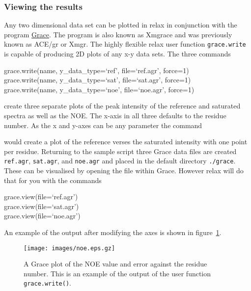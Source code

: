 \subsubsection{Viewing the results}

Any two dimensional data set can be plotted in relax in conjunction with the program \href{http://plasma-gate.weizmann.ac.il/Grace/}{Grace}.  The program is also known as Xmgrace and was previously known as ACE/gr or Xmgr.  The highly flexible relax user function \texttt{grace.write} is capable of producing 2D plots of any x-y data sets.  The three commands

\begin{exampleenv}
grace.write(name, y\_data\_type=`ref', file=`ref.agr', force=1) \\
grace.write(name, y\_data\_type=`sat', file=`sat.agr', force=1) \\
grace.write(name, y\_data\_type=`noe', file=`noe.agr', force=1)
\end{exampleenv}

create three separate plots of the peak intensity of the reference and saturated spectra as well as the NOE.  The x-axis in all three defaults to the residue number.  As the x and y-axes can be any parameter the command


would create a plot of the reference verses the saturated intensity with one point per residue.  Returning to the sample script three Grace data files are created \texttt{ref.agr}, \texttt{sat.agr}, and \texttt{noe.agr} and placed in the default directory \texttt{./grace}.  These can be visualised by opening the file within Grace.  However relax will do that for you with the commands

\begin{exampleenv}
grace.view(file=`ref.agr') \\
grace.view(file=`sat.agr') \\
grace.view(file=`noe.agr')
\end{exampleenv}

An example of the output after modifying the axes is shown in figure~\ref{fig: NOE plot}.

\begin{figure}
\centerline{\texttt{[image: images/noe.eps.gz]}}
\caption[NOE plot]{A Grace plot of the NOE value and error against the residue number.  This is an example of the output of the user function \texttt{grace.write()}.}\label{fig: NOE plot}
\end{figure}



